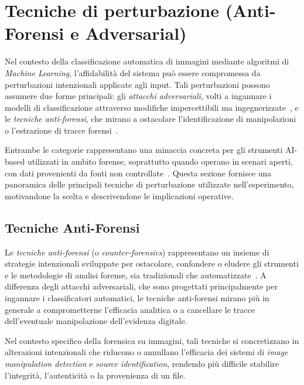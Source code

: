 \section{Tecniche di perturbazione (Anti-Forensi e Adversarial)} \label{chap:algoritmi}


Nel contesto della classificazione automatica di immagini mediante algoritmi di \textit{Machine Learning}, l’affidabilità del sistema può essere compromessa da perturbazioni intenzionali applicate agli input. Tali perturbazioni possono assumere due forme principali: gli \textit{attacchi adversariali}, volti a ingannare i modelli di classificazione attraverso modifiche impercettibili ma ingegnerizzate~\cite{szegedy2013intriguing, goodfellow2014explaining}, e le \textit{tecniche anti-forensi}, che mirano a ostacolare l’identificazione di manipolazioni o l’estrazione di tracce forensi~\cite{barni2018cf, nowroozi2020phd}.

Entrambe le categorie rappresentano una minaccia concreta per gli strumenti AI-based utilizzati in ambito forense, soprattutto quando operano in scenari aperti, con dati provenienti da fonti non controllate~\cite{costantini2019digital}. Questa sezione fornisce una panoramica delle principali tecniche di perturbazione utilizzate nell’esperimento, motivandone la scelta e descrivendone le implicazioni operative.




\subsection{Tecniche Anti-Forensi} \label{sec:anti-forensi}

Le \textit{tecniche anti-forensi} (o \textit{counter-forensics}) rappresentano un insieme di strategie intenzionali sviluppate per ostacolare, confondere o eludere gli strumenti e le metodologie di analisi forense, sia tradizionali che automatizzate~\cite{barni2018cf, nowroozi2020phd}. A differenza degli attacchi adversariali, che sono progettati principalmente per ingannare i classificatori automatici, le tecniche anti-forensi mirano più in generale a comprometterne l’efficacia analitica o a cancellare le tracce dell’eventuale manipolazione dell’evidenza digitale.

Nel contesto specifico della forensica su immagini, tali tecniche si concretizzano in alterazioni intenzionali che riducono o annullano l’efficacia dei sistemi di \textit{image manipulation detection} e \textit{source identification}, rendendo più difficile stabilire l’integrità, l’autenticità o la provenienza di un file.

